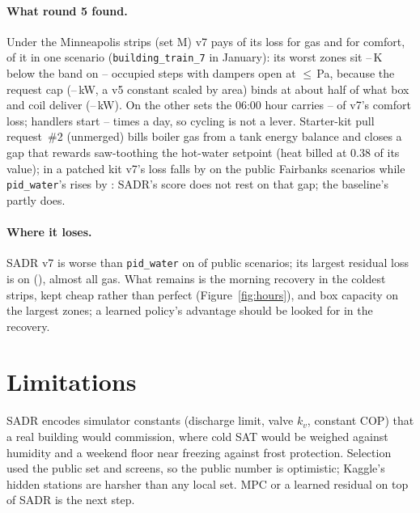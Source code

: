 \documentclass{article}
\begin{document}
\paragraph{What round 5 found.}
Under the Minneapolis strips (set M) v7 pays \RFiveDecMinnGasShare{} of its loss for gas and
\RFiveDecMinnComfortShare{} for comfort, \RFiveCapComfortShareOfMinn{} of it in one scenario
(\texttt{building\_train\_7} in January): its \RFiveCapNZones{} worst zones sit \RFiveCapDefMin--\RFiveCapDefMax\,K
below the band on \RFiveCapStepsMin--\RFiveCapStepsMax{} occupied steps with dampers open at
$\le$\RFiveCapPaMax\,Pa, because the request cap (\RFiveCapReqKwMin--\RFiveCapReqKwMax\,kW, a v5 constant
scaled by area) binds at about half of what box and coil deliver (\RFiveCapWaterKwMin--\RFiveCapWaterKwMax\,kW).
On the other sets the 06:00 hour carries \RFiveComfHSixPub--\RFiveComfHSixFresh{} of v7's comfort loss;
handlers start \RFiveAhuStartsMin--\RFiveAhuStartsMax{} times a day, so cycling is not a lever. Starter-kit
pull request~\#2 (unmerged) bills boiler gas from a tank energy balance and closes a gap that rewards
saw-toothing the hot-water setpoint (heat billed at 0.38 of its value); in a patched kit v7's loss falls by
\RFivePrTwoVSevenRelAbs{} on the \RFivePrTwoVSevenN{} public Fairbanks scenarios while \texttt{pid\_water}'s rises by
\RFivePrTwoPidRelAbs{}: SADR's score does not rest on that gap; the baseline's partly does.

\paragraph{Where it loses.}
SADR v7 is worse than \texttt{pid\_water} on \RFNScenWorseCand{} of \NScen{} public scenarios;
its largest residual loss is on \RFMaxCandScen{} (\RFMaxCandScore), almost all gas. What remains is the
morning recovery in the coldest strips, kept cheap rather than perfect (Figure~\ref{fig:hours}), and box
capacity on the largest zones; a learned policy's advantage should be looked for in the recovery.

\section{Limitations}
SADR encodes simulator constants (discharge limit, valve $k_v$, constant COP) that a real building would
commission, where cold SAT would be weighed against humidity and a weekend floor near freezing against frost
protection. Selection used the public set and screens, so the public number is optimistic; Kaggle's hidden
stations are harsher than any local set. MPC or a learned residual on top of SADR is the next step.
\end{document}
